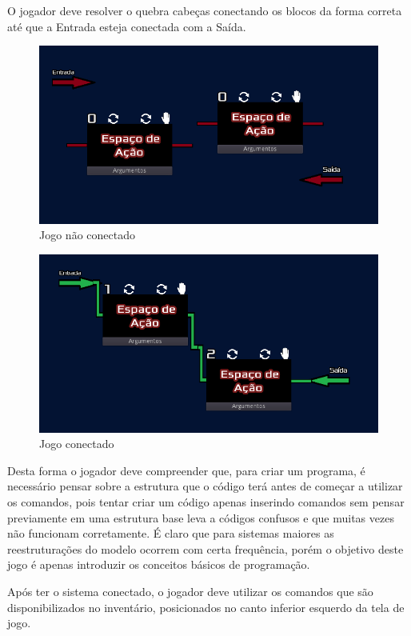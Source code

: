 O jogador deve resolver o quebra cabeças conectando os blocos da forma correta
até que a Entrada esteja conectada com a Saída.

\begin{figure}[H]
    \includegraphics[width=\textwidth]{../figuras/jogo_nao_conectado.png}
    \caption{Jogo não conectado}
\end{figure}

\begin{figure}[H]
    \includegraphics[width=\textwidth]{../figuras/jogo_conectado.png}
    \caption{Jogo conectado}
\end{figure}

Desta forma o jogador deve compreender que, para criar um programa, é necessário
pensar sobre a estrutura que o código terá antes de começar a utilizar os 
comandos, pois tentar criar um código apenas inserindo comandos sem pensar
previamente em uma estrutura base leva a códigos confusos e que muitas vezes
não funcionam corretamente. É claro que para sistemas maiores as reestruturações
do modelo ocorrem com certa frequência, porém o objetivo deste jogo é apenas
introduzir os conceitos básicos de programação.

Após ter o sistema conectado, o jogador deve utilizar os comandos que são
disponibilizados no inventário, posicionados no canto inferior esquerdo da tela 
de jogo.

